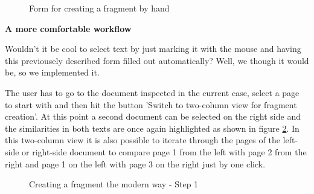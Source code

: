 \begin{figure}[!h]
  \centering
  \caption{Form for creating a fragment by hand}
  \label{fig:fragment-form}
\end{figure}

\textbf{A more comfortable workflow}

Wouldn't it be cool to select text by just marking it with the mouse and having this previousely described form filled out automatically? Well, we though it would be,  so we implemented it. 

The user has to go to the document inspected in the current case, select a page to start with and then hit the button 'Switch to two-column view for fragment creation'. At this point a second document can be selected on the right side and the similarities in both texts are once again highlighted as shown in figure \ref{fig:creating-fragment-modern-way-1}. In this two-column view it is also possible to iterate through the pages of the left-side or right-side document to compare page 1 from the left with page 2 from the right and page 1 on the left with page 3 on the right just by one click.

\begin{figure}[!h]
  \centering
  \caption{Creating a fragment the modern way - Step 1}
  \label{fig:creating-fragment-modern-way-1}
\end{figure}

